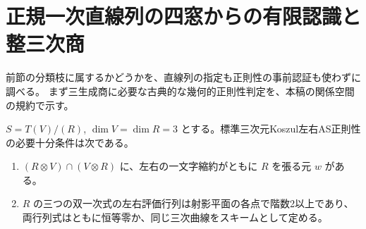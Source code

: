\section{正規一次直線列の四窓からの有限認識と整三次商}
\label{sec:normal-line-recognition}
前節の分類枝に属するかどうかを、直線列の指定も正則性の事前認証も使わずに調べる。
まず三生成商に必要な古典的な幾何的正則性判定を、本稿の関係空間の規約で示す。

\begin{lemma}\label{lem:ternary-finite-graph-test}
$S=T(V)/(R)$, $\dim V=\dim R=3$ とする。標準三次元Koszul左右AS正則性の必要十分条件は次である。
\begin{enumerate}
\item $(R\otimes V)\cap(V\otimes R)$ に、左右の一文字縮約がともに $R$ を張る元 $w$ がある。
\item $R$ の三つの双一次式の左右評価行列は射影平面の各点で階数2以上であり、
両行列式はともに恒等零か、同じ三次曲線をスキームとして定める。
\end{enumerate}
\end{lemma}
